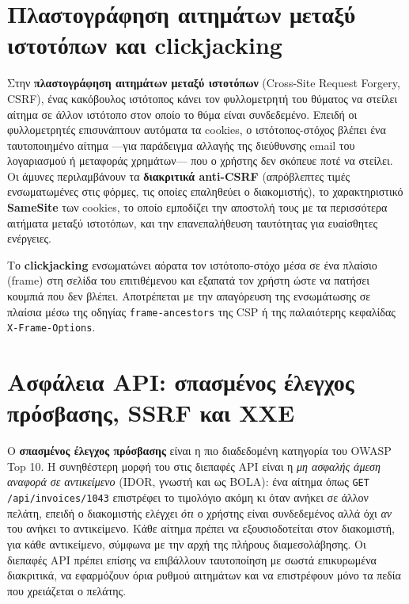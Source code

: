 \section{Πλαστογράφηση αιτημάτων μεταξύ ιστοτόπων και clickjacking}\label{sec:9.4}
Στην \textbf{πλαστογράφηση αιτημάτων μεταξύ ιστοτόπων} (Cross-Site Request Forgery, CSRF), ένας κακόβουλος ιστότοπος κάνει τον φυλλομετρητή του θύματος να στείλει αίτημα σε άλλον ιστότοπο στον οποίο το θύμα είναι συνδεδεμένο. Επειδή οι φυλλομετρητές επισυνάπτουν αυτόματα τα cookies, ο ιστότοπος-στόχος βλέπει ένα ταυτοποιημένο αίτημα —για παράδειγμα αλλαγής της διεύθυνσης email του λογαριασμού ή μεταφοράς χρημάτων— που ο χρήστης δεν σκόπευε ποτέ να στείλει. Οι άμυνες περιλαμβάνουν τα \textbf{διακριτικά anti-CSRF} (απρόβλεπτες τιμές ενσωματωμένες στις φόρμες, τις οποίες επαληθεύει ο διακομιστής), το χαρακτηριστικό \textbf{SameSite} των cookies, το οποίο εμποδίζει την αποστολή τους με τα περισσότερα αιτήματα μεταξύ ιστοτόπων, και την επανεπαλήθευση ταυτότητας για ευαίσθητες ενέργειες.

Το \textbf{clickjacking} ενσωματώνει αόρατα τον ιστότοπο-στόχο μέσα σε ένα πλαίσιο (frame) στη σελίδα του επιτιθέμενου και εξαπατά τον χρήστη ώστε να πατήσει κουμπιά που δεν βλέπει. Αποτρέπεται με την απαγόρευση της ενσωμάτωσης σε πλαίσια μέσω της οδηγίας \texttt{frame-ancestors} της CSP ή της παλαιότερης κεφαλίδας \texttt{X-Frame-Options}.

\section{Ασφάλεια API: σπασμένος έλεγχος πρόσβασης, SSRF και XXE}\label{sec:9.5}
Ο \textbf{σπασμένος έλεγχος πρόσβασης} είναι η πιο διαδεδομένη κατηγορία του OWASP Top 10. Η συνηθέστερη μορφή του στις διεπαφές API είναι η \emph{μη ασφαλής άμεση αναφορά σε αντικείμενο} (IDOR, γνωστή και ως BOLA): ένα αίτημα όπως \texttt{GET /api/invoices/1043} επιστρέφει το τιμολόγιο ακόμη κι όταν ανήκει σε άλλον πελάτη, επειδή ο διακομιστής ελέγχει \emph{ότι} ο χρήστης είναι συνδεδεμένος αλλά όχι \emph{αν} του ανήκει το αντικείμενο. Κάθε αίτημα πρέπει να εξουσιοδοτείται στον διακομιστή, για κάθε αντικείμενο, σύμφωνα με την αρχή της πλήρους διαμεσολάβησης. Οι διεπαφές API πρέπει επίσης να επιβάλλουν ταυτοποίηση με σωστά επικυρωμένα διακριτικά, να εφαρμόζουν όρια ρυθμού αιτημάτων και να επιστρέφουν μόνο τα πεδία που χρειάζεται ο πελάτης.

